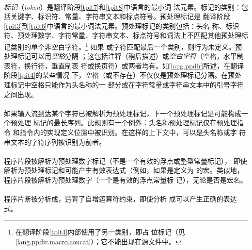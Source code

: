 {\paragraph{}
\textit{标记}（\textit{token}）是翻译阶段\ref{tpit7}和\ref{tpit8}中语言的最小词
法元素。标记的类别：包括关键字、标识符、常量、字符串文本和标点符号。预处理标记是
翻译阶段\ref{tpit3}到\ref{tpit6}中语言的最小词法元素。预处理标记的类别包括：头名
称、标识符、预处理数字、字符常量、字符串文本、标点符号和词法上不匹配其他预处理标
记类别的单个非空白字符。\footnote{在翻译阶段\ref{tpit4}内部使用了另一类别，即占
位标记（见\ref{lang.ppdir.macro.concat}）；它不能出现在源文件中。} 如果\tm{\sq}
或\tm{\dq}字符匹配最后一个类别，则行为未定义。预处理标记可以用\textit{空格}分隔
；这包括注释（稍后描述）或\textit{空白字符}（空格，水平制表符，换行符，垂直制表
符或换页符）或两者均有。如\ref{lang.ppdir}所述，在翻译阶段\ref{tpit4}的某些情况
下，空格（或不存在）不仅仅是预处理标记分隔。在预处理标记中空格只能作为头名称的一
部分或在字符常量或字符串文本中的引号字符之间出现。

\paragraph{}
如果输入流到达某个字符已被解析为预处理标记，下一个预处理标记是可能构成一个预处理
标记的最长序列。此规则有一个例外：头名称预处理标记仅在预处理指令
和指令内的实现定义位置中被识别。在这样的上下文中，可以是头名称或字
符串文本的字符序列被识别为前者。

\paragraph{}
\ex 程序片段被解析为预处理数字标记（不是一个有效的浮点或整型常量标记），
即使解析为预处理标记和可能产生有效表达式（例如，如果是定义为
的宏。类似地，程序片段被解析为预处理数字（一个是有效的浮点常量标
记），无论是否是宏名。

\paragraph{}
\ex 程序片断被分析成，违背了自增运算符约束，即使分析
成可以产生正确的表达式。


\syntax
}
